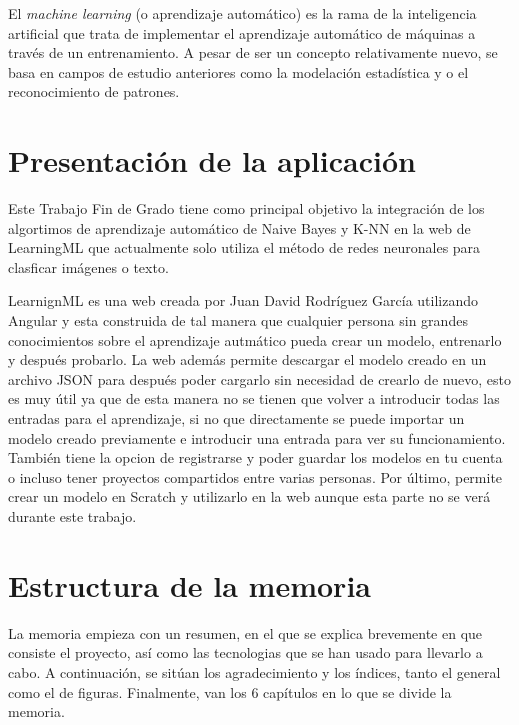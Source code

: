 \documentclass[a4paper, 12pt]{book}
\begin{document}
El \emph{machine learning} (o aprendizaje automático) es la rama de la inteligencia artificial que trata de implementar el aprendizaje automático de máquinas a través de un entrenamiento. A pesar de ser un concepto relativamente nuevo, se basa en campos de estudio anteriores como la modelación estadística y o el reconocimiento de patrones.

\section{Presentación de la aplicación}
\label{sec:presentacionaplicacion}

Este Trabajo Fin de Grado tiene como principal objetivo la integración de los algortimos de aprendizaje automático de Naive Bayes y K-NN en la web de LearningML que actualmente solo utiliza el método de redes neuronales para clasficar imágenes o texto.

LearnignML es una web creada por Juan David Rodríguez García utilizando Angular y esta construida de tal manera que cualquier persona sin grandes conocimientos sobre el aprendizaje autmático pueda crear un modelo, entrenarlo y después probarlo. La web además permite descargar el modelo creado en un archivo JSON para después poder cargarlo sin necesidad de crearlo de nuevo, esto es muy útil ya que de esta manera no se tienen que volver a introducir todas las entradas para el aprendizaje, si no que directamente se puede importar un modelo creado previamente e introducir una entrada para ver su funcionamiento. También tiene la opcion de registrarse y poder guardar los modelos en tu cuenta o incluso tener proyectos compartidos entre varias personas. Por último, permite crear un modelo en Scratch y utilizarlo en la web aunque esta parte no se verá durante este trabajo.


\section{Estructura de la memoria}
\label{sec:estructura}

La memoria empieza con un resumen, en el que se explica brevemente en que consiste el proyecto, así como las tecnologias que se han usado para llevarlo a cabo. A continuación, se sitúan los agradecimiento y los índices, tanto el general como el de figuras. Finalmente, van los 6 capítulos en lo que se divide la memoria.
\end{document}
